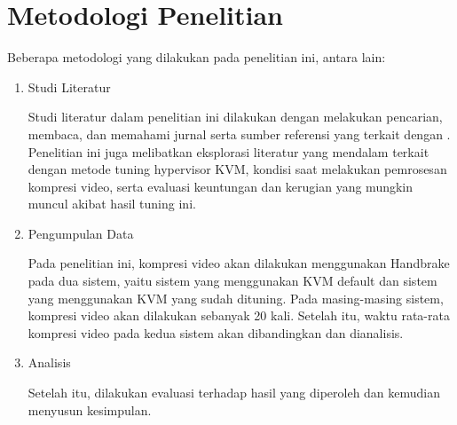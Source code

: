 

\section{Metodologi Penelitian}
\hspace{0.5cm} Beberapa metodologi yang dilakukan pada penelitian ini, antara lain:
\begin{enumerate}
  \item Studi Literatur
  
  Studi literatur dalam penelitian ini dilakukan dengan melakukan pencarian, membaca, dan memahami jurnal serta sumber referensi yang terkait dengan \cc. Penelitian ini juga melibatkan eksplorasi literatur yang mendalam terkait dengan metode tuning hypervisor KVM, kondisi saat melakukan pemrosesan kompresi video, serta evaluasi keuntungan dan kerugian yang mungkin muncul akibat hasil tuning ini.
  
  \item Pengumpulan Data
  
  Pada penelitian ini, kompresi video akan dilakukan menggunakan Handbrake pada dua sistem, yaitu sistem yang menggunakan KVM default dan sistem yang menggunakan KVM yang sudah dituning. Pada masing-masing sistem, kompresi video akan dilakukan sebanyak 20 kali. Setelah itu, waktu rata-rata kompresi video pada kedua sistem akan dibandingkan dan dianalisis.
  
  \item Analisis
  
  Setelah itu, dilakukan evaluasi terhadap hasil yang diperoleh dan kemudian menyusun kesimpulan.
\end{enumerate}


